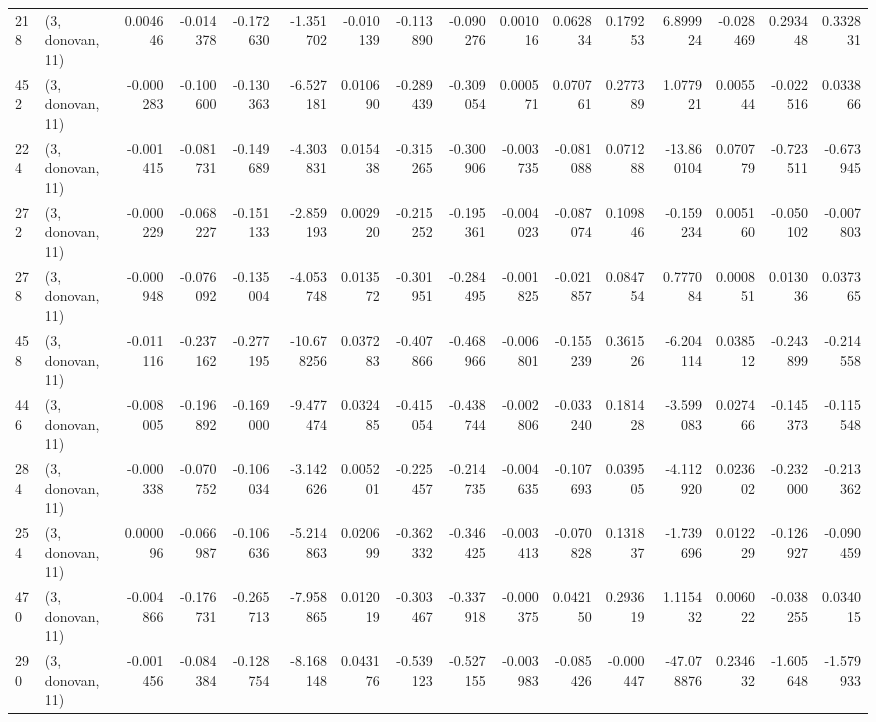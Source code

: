 \begin{tabular}{llrrrrrrrrrrrrrr}
218 &  (3, donovan, 11) &   0.004646 & -0.014378 & -0.172630 &   -1.351702 & -0.010139 &  -0.113890 & -0.090276 &  0.001016 &  0.062834 &  0.179253 &    6.899924 & -0.028469 &  0.293448 &  0.332831 \\
452 &  (3, donovan, 11) &  -0.000283 & -0.100600 & -0.130363 &   -6.527181 &  0.010690 &  -0.289439 & -0.309054 &  0.000571 &  0.070761 &  0.277389 &    1.077921 &  0.005544 & -0.022516 &  0.033866 \\
224 &  (3, donovan, 11) &  -0.001415 & -0.081731 & -0.149689 &   -4.303831 &  0.015438 &  -0.315265 & -0.300906 & -0.003735 & -0.081088 &  0.071288 &  -13.860104 &  0.070779 & -0.723511 & -0.673945 \\
272 &  (3, donovan, 11) &  -0.000229 & -0.068227 & -0.151133 &   -2.859193 &  0.002920 &  -0.215252 & -0.195361 & -0.004023 & -0.087074 &  0.109846 &   -0.159234 &  0.005160 & -0.050102 & -0.007803 \\
278 &  (3, donovan, 11) &  -0.000948 & -0.076092 & -0.135004 &   -4.053748 &  0.013572 &  -0.301951 & -0.284495 & -0.001825 & -0.021857 &  0.084754 &    0.777084 &  0.000851 &  0.013036 &  0.037365 \\
458 &  (3, donovan, 11) &  -0.011116 & -0.237162 & -0.277195 &  -10.678256 &  0.037283 &  -0.407866 & -0.468966 & -0.006801 & -0.155239 &  0.361526 &   -6.204114 &  0.038512 & -0.243899 & -0.214558 \\
446 &  (3, donovan, 11) &  -0.008005 & -0.196892 & -0.169000 &   -9.477474 &  0.032485 &  -0.415054 & -0.438744 & -0.002806 & -0.033240 &  0.181428 &   -3.599083 &  0.027466 & -0.145373 & -0.115548 \\
284 &  (3, donovan, 11) &  -0.000338 & -0.070752 & -0.106034 &   -3.142626 &  0.005201 &  -0.225457 & -0.214735 & -0.004635 & -0.107693 &  0.039505 &   -4.112920 &  0.023602 & -0.232000 & -0.213362 \\
254 &  (3, donovan, 11) &   0.000096 & -0.066987 & -0.106636 &   -5.214863 &  0.020699 &  -0.362332 & -0.346425 & -0.003413 & -0.070828 &  0.131837 &   -1.739696 &  0.012229 & -0.126927 & -0.090459 \\
470 &  (3, donovan, 11) &  -0.004866 & -0.176731 & -0.265713 &   -7.958865 &  0.012019 &  -0.303467 & -0.337918 & -0.000375 &  0.042150 &  0.293619 &    1.115432 &  0.006022 & -0.038255 &  0.034015 \\
290 &  (3, donovan, 11) &  -0.001456 & -0.084384 & -0.128754 &   -8.168148 &  0.043176 &  -0.539123 & -0.527155 & -0.003983 & -0.085426 & -0.000447 &  -47.078876 &  0.234632 & -1.605648 & -1.579933 \\

\end{tabular}
